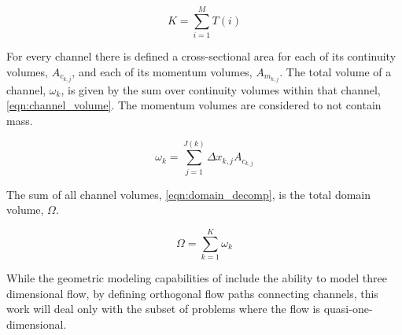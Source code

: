 \begin{equation}
\label{eqn:number_of_channels}
K = \sum_{i = 1}^{M} T(i)
\end{equation}

For every channel there is defined a cross-sectional area for each of its continuity volumes, $A_{c_{k,j}}$, and each of its momentum volumes, $A_{m_{k,j}}$.
The total volume of a channel, $\omega_k$, is given by the sum over continuity volumes within that channel, \eqref{eqn:channel_volume}.
The momentum volumes are considered to not contain mass.

\begin{equation}
\label{eqn:channel_volume}
\omega_k = \sum_{j = 1}^{J(k)} \Delta x_{k,j} A_{c_{k,j}}
\end{equation}

The sum of all channel volumes, \eqref{eqn:domain_decomp}, is the total domain volume, $\Omega$.

\begin{equation}
\label{eqn:domain_decomp}
\Omega = \sum_{k = 1}^{K} \omega_{k}
\end{equation}

While the geometric modeling capabilities of \cobra include the ability to model three dimensional flow, by defining orthogonal flow paths connecting channels, this work will deal only with the subset of problems where the flow is quasi-one-dimensional.

